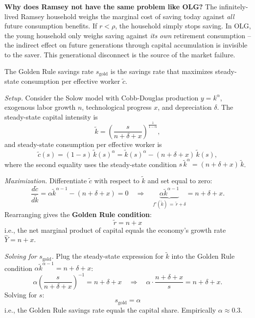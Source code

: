 \begin{tcolorbox}[
    colback=blue!1!white,
    colframe=blue!40!white,
    title=Dynamic Inefficiency: From Solow to Ramsey to OLG,
    fonttitle=\bfseries
    ]
\textbf{Why does Ramsey not have the same problem like OLG?} The infinitely-lived Ramsey household weighs the marginal cost of saving today against \textit{all} future consumption benefits. If $r < \rho$, the household simply stops saving. In OLG, the young household only weighs saving against \textit{its own} retirement consumption -- the indirect effect on future generations through capital accumulation is invisible to the saver. This generational disconnect is the source of the market failure.
\end{tcolorbox}



\begin{tcolorbox}[
    colback=blue!1!white,
    colframe=blue!40!white,
    title=Derivation of the optimal savings rate in the Solow model,
    fonttitle=\bfseries
    ]
The Golden Rule savings rate $s_{\text{gold}}$ is the savings rate that maximizes steady-state consumption per effective worker $\tilde c$.

\textit{Setup.} Consider the Solow model with Cobb-Douglas production $y = k^\alpha$, exogenous labor growth $n$, technological progress $x$, and depreciation $\delta$. The steady-state capital intensity is
\[
    \tilde k = \left(\frac{s}{n+\delta+x}\right)^{\frac{1}{1-\alpha}},
\]
and steady-state consumption per effective worker is
\[
    \tilde c(s) = (1-s)\, \tilde k(s)^\alpha = \tilde k(s)^\alpha - (n+\delta+x)\, \tilde k(s),
\]
where the second equality uses the steady-state condition $s\, \tilde k^\alpha = (n+\delta+x)\,\tilde k$.

\textit{Maximization.} Differentiate $\tilde c$ with respect to $\tilde k$ and set equal to zero:
\[
    \frac{d\tilde c}{d\tilde k} = \alpha \tilde k^{\alpha-1} - (n+\delta+x) = 0 \quad \Longrightarrow \quad \underbrace{\alpha \tilde k^{\alpha-1}}_{f'(\tilde k)\, =\, \tilde r + \delta} = n+\delta+x.
\]
Rearranging gives the \textbf{Golden Rule condition}:
\[
    \boxed{\; \tilde r = n + x \;}
\]
i.e., the net marginal product of capital equals the economy's growth rate $\hat Y = n + x$.

\textit{Solving for $s_{\text{gold}}$.} Plug the steady-state expression for $\tilde k$ into the Golden Rule condition $\alpha \tilde k^{\alpha-1} = n+\delta+x$:
\[
    \alpha \left(\frac{s}{n+\delta+x}\right)^{-1} = n+\delta+x \quad \Longrightarrow \quad \alpha \cdot \frac{n+\delta+x}{s} = n+\delta+x.
\]
Solving for $s$:
\[
    \boxed{\; s_{\text{gold}} = \alpha \;}
\]
i.e., the Golden Rule savings rate equals the capital share. Empirically $\alpha \approx 0.3$.


\end{tcolorbox}
